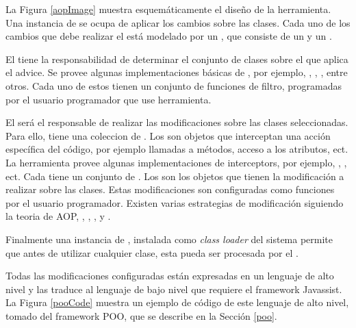 	La Figura \ref{aopImage} muestra esquemáticamente el diseño de la herramienta.
	Una instancia de  se ocupa de aplicar los cambios sobre las
	clases.
	Cada uno de los cambios que debe realizar el  está
	modelado por un , que consiste de un  y un
	.
	
	El  tiene la responsabilidad de determinar el conjunto de
	clases sobre el que aplica el advice. Se provee algunas implementaciones básicas
	de , por ejemplo, , , 
	, entre otros. Cada uno de estos  tienen un conjunto de funciones
	de filtro, programadas por el usuario programador que use herramienta. 

	El  será el responsable de realizar las modificaciones 
	sobre las clases seleccionadas. Para ello, tiene una coleccion de .
 	Los   son objetos que interceptan una acción específica del código,  por ejemplo
 	llamadas a métodos, acceso a los atributos, ect. La herramienta provee algunas implementaciones de interceptors,
 	por ejemplo, , , ect. 
 	Cada  tiene un conjunto de .
 	Los  son los objetos que tienen la modificación a realizar sobre las clases. 
 	Estas modificaciones son configuradas como funciones por el usuario programador.
 	Existen varias estrategias de modificación siguiendo la teoria de AOP, , , ,
 	 y . 
	 
	Finalmente una instancia de , instalada como \emph{class
	loader} del sistema permite que antes de utilizar cualquier clase, esta pueda
	ser procesada por el .
	
	Todas las modificaciones configuradas están expresadas en un
	lenguaje de alto nivel y las traduce al lenguaje de bajo nivel que requiere el
	framework Javassist.
	La Figura \ref{pooCode} muestra un ejemplo de código de este lenguaje de alto nivel,
	tomado del framework POO, que se describe en la Sección \ref{poo}.
	
